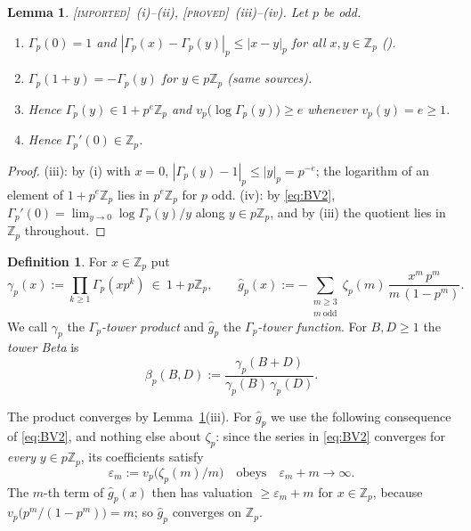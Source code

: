 \documentclass[11pt,reqno]{article}
\newcommand{\Zp}{\mathbb{Z}_p}
\newcommand{\Gp}{\Gamma_p}
\newcommand{\gtow}{\gamma_p}
\newcommand{\gh}{\widehat{g}_p}
\newcommand{\bet}{\beta_p}
\newcommand{\vp}{v_p}
\newcommand{\PROVED}{{\normalfont\textsc{[proved]}}}
\newcommand{\IMPORTED}{{\normalfont\textsc{[imported]}}}
\theoremstyle{plain}
\newtheorem{lemma}[theorem]{Lemma}
\theoremstyle{definition}
\newtheorem{definition}[theorem]{Definition}
\theoremstyle{remark}
\numberwithin{equation}{section}
\begin{document}
\begin{lemma}\label{lem:lip}
\IMPORTED\ (i)--(ii), \PROVED\ (iii)--(iv).  Let $p$ be odd.
\begin{enumerate}[label=(\roman*),leftmargin=2em]
\item $\Gp(0)=1$ and $|\Gp(x)-\Gp(y)|_p\le|x-y|_p$ for all $x,y\in\Zp$
  \textup{(}\cite{Morita1975,Robert2000}\textup{)}.
\item $\Gp(1+y)=-\Gp(y)$ for $y\in p\Zp$ \textup{(}same sources\textup{)}.
\item Hence $\Gp(y)\in1+p^{e}\Zp$ and $\vp\bigl(\log\Gp(y)\bigr)\ge e$ whenever
  $\vp(y)=e\ge1$.
\item Hence $\Gp'(0)\in\Zp$.
\end{enumerate}
\end{lemma}

\begin{proof}
(iii): by (i) with $x=0$, $|\Gp(y)-1|_p\le|y|_p=p^{-e}$; the logarithm of an
element of $1+p^e\Zp$ lies in $p^e\Zp$ for $p$ odd.  (iv): by \eqref{eq:BV2},
$\Gp'(0)=\lim_{y\to0}\log\Gp(y)/y$ along $y\in p\Zp$, and by (iii) the quotient
lies in $\Zp$ throughout.
\end{proof}

\begin{definition}\label{def:tower}
For $x\in\Zp$ put
\[
  \gtow(x):=\prod_{k\ge1}\Gp(xp^k)\ \in\ 1+p\Zp,
  \qquad
  \gh(x):=-\!\!\sum_{\substack{m\ge3\\ m\ \mathrm{odd}}}\!\!
    \zeta_p(m)\,\frac{x^m\,p^m}{m\,(1-p^m)} .
\]
We call $\gtow$ the \emph{$\Gp$-tower product} and $\gh$ the \emph{$\Gp$-tower
function}.  For $B,D\ge1$ the \emph{tower Beta} is
\[
  \bet(B,D):=\frac{\gtow(B+D)}{\gtow(B)\,\gtow(D)} .
\]
\end{definition}

The product converges by Lemma~\ref{lem:lip}(iii).  For $\gh$ we use the
following consequence of \eqref{eq:BV2}, and nothing else about $\zeta_p$:
since the series in \eqref{eq:BV2} converges for \emph{every} $y\in p\Zp$,
its coefficients satisfy
\begin{equation}\label{eq:eps}
  \varepsilon_m:=\vp\bigl(\zeta_p(m)/m\bigr)\quad\text{obeys}\quad
  \varepsilon_m+m\longrightarrow\infty .
\end{equation}
The $m$-th term of $\gh(x)$ then has valuation $\ge\varepsilon_m+m$ for
$x\in\Zp$, because $\vp\bigl(p^m/(1-p^m)\bigr)=m$; so $\gh$ converges on $\Zp$.
\end{document}
